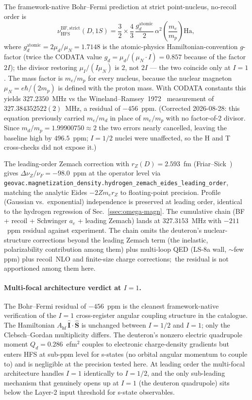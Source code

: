 \documentclass[twocolumn,prc,amsmath,amssymb,superscriptaddress]{revtex4-2}
\begin{document}
The framework-native Bohr--Fermi prediction at strict point-nucleus,
no-recoil order is
\begin{equation}
  \nu_{\mathrm{HFS}}^{\mathrm{BF,strict}}(D, 1S)
  = \frac{3}{2} \times \frac{4}{3}\,
    \frac{g_d^{\mathrm{atomic}}}{2}\, \alpha^2
    \left(\frac{m_e}{m_p}\right) \mathrm{Ha},
\label{eq:d-hfs-bf}
\end{equation}
where $g_d^{\mathrm{atomic}} = 2 \mu_d/\mu_N = 1.7148$ is the
atomic-physics Hamiltonian-convention $g$-factor (twice the
CODATA value $g_d = \mu_d/(\mu_N \cdot I) = 0.857$ because of the
factor $2I$); the divisor restoring $\mu_I/(I\mu_N)$ is $2$, not $2I$
--- the two coincide only at $I=1$.  The
mass factor is $m_e/m_p$ for every nucleus, because the nuclear
magneton $\mu_N = e\hbar/(2m_p)$ is defined with the proton mass.
With CODATA constants this yields $327.2350$~MHz vs the
Wineland--Ramsey~1972~\cite{WinelandRamsey1972} measurement of
$327.384352522(2)$~MHz, a residual of $-456$~ppm.  (Corrected
2026-08-28: this equation previously carried $m_e/m_d$ in place of
$m_e/m_p$ with no factor-of-$2$ divisor.  Since $m_d/m_p = 1.99900750 \approx 2$
the two errors nearly cancelled, leaving the baseline high by
$496.5$~ppm; $I=1/2$ nuclei were unaffected, so the H and T
cross-checks did not expose it.)

The leading-order Zemach correction with $r_Z(D) = 2.593$~fm
(Friar--Sick~\cite{FriarSick2004}) gives
$\Delta\nu_Z/\nu_F = -98.0$~ppm at the operator level via
\texttt{geovac.magnetization\_density.hydrogen\_zemach\_eides\_leading\_order},
matching the analytic Eides $-2 Z m_e r_Z$ to floating-point precision.
Profile (Gaussian vs.\ exponential) independence is preserved at
leading order, identical to the hydrogen regression of
Sec.~\ref{ssec:omega-magn}. The cumulative chain
(BF + recoil + Schwinger $a_e$ + leading Zemach) lands at $327.3153$~MHz
with $-211$~ppm residual against experiment.  The chain omits the
deuteron's nuclear-structure corrections beyond the leading Zemach
term (the inelastic, polarizability contribution among them) plus
multi-loop QED (LS-8a wall, $\sim$few ppm) plus recoil~NLO and
finite-size charge corrections;\ the residual is not apportioned among
them here.

\paragraph{Multi-focal architecture verdict at $I=1$.}
The Bohr--Fermi residual of $-456$~ppm is the cleanest framework-native
verification of the $I=1$ cross-register angular coupling structure
in the catalogue. The Hamiltonian
$A_\text{hf}\,\hat{\mathbf{I}}\cdot\hat{\mathbf{S}}$ is unchanged
between $I=1/2$ and $I=1$; only the Clebsch--Gordan multiplicity
differs. The deuteron's nonzero electric quadrupole moment
$Q_d = 0.286$~efm$^2$ couples to electronic charge-density gradients
but enters HFS at sub-ppm level for s-states (no orbital angular
momentum to couple to) and is negligible at the precision tested here.
At leading order the multi-focal architecture handles $I=1$ identically
to $I=1/2$, and the only sub-leading mechanism that genuinely opens up
at $I=1$ (the deuteron quadrupole) sits below the Layer-2 input
threshold for s-state observables.
\end{document}
